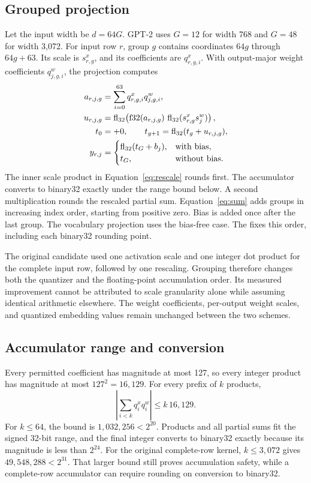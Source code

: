 \subsection{Grouped projection}

Let the input width be $d=64G$.  GPT-2 uses $G=12$ for width 768 and $G=48$ for width 3,072.  For input row $r$, group $g$ contains coordinates $64g$ through $64g+63$.  Its scale is $s^x_{r,g}$, and its coefficients are $q^x_{r,g,i}$.  With output-major weight coefficients $q^w_{j,g,i}$, the projection computes
\begin{align}
 a_{r,j,g}&=\sum_{i=0}^{63}q^x_{r,g,i}q^w_{j,g,i},\label{eq:dot}\\
 u_{r,j,g}&=\operatorname{fl}_{32}\!\left(\operatorname{f32}(a_{r,j,g})\,
                 \operatorname{fl}_{32}(s^x_{r,g}s^w_j)\right),\label{eq:rescale}\\
 t_0&=+0,\qquad t_{g+1}=\operatorname{fl}_{32}(t_g+u_{r,j,g}),\label{eq:sum}\\
 y_{r,j}&=\begin{cases}\operatorname{fl}_{32}(t_G+b_j),&\text{with bias},\\t_G,&\text{without bias}.
 \end{cases}\label{eq:bias}
\end{align}
The inner scale product in Equation~\eqref{eq:rescale} rounds first.  The accumulator converts to binary32 exactly under the range bound below.  A second multiplication rounds the rescaled partial sum.  Equation~\eqref{eq:sum} adds groups in increasing index order, starting from positive zero.  Bias is added once after the last group.  The vocabulary projection uses the bias-free case.  The  fixes this order, including each binary32 rounding point.

The original candidate used one activation scale and one integer dot product for the complete input row, followed by one rescaling.  Grouping therefore changes both the quantizer and the floating-point accumulation order.  Its measured improvement cannot be attributed to scale granularity alone while assuming identical arithmetic elsewhere.  The weight coefficients, per-output weight scales, and quantized embedding values remain unchanged between the two schemes.

\subsection{Accumulator range and conversion}

Every permitted coefficient has magnitude at most 127, so every integer product has magnitude at most $127^2=16{,}129$.  For every prefix of $k$ products,
\begin{equation}
 \left|\sum_{i<k}q^x_iq^w_i\right|\leq k\,16{,}129.
 \label{eq:prefix}
\end{equation}
For $k\leq64$, the bound is $1{,}032{,}256<2^{20}$.  Products and all partial sums fit the signed 32-bit range, and the final integer converts to binary32 exactly because its magnitude is less than $2^{24}$.  For the original complete-row kernel, $k\leq3{,}072$ gives $49{,}548{,}288<2^{31}$.  That larger bound still proves accumulation safety, while a complete-row accumulator can require rounding on conversion to binary32.

